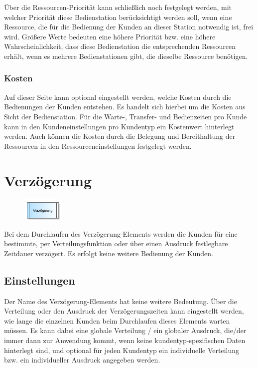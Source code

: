 Über die Ressourcen-Priorität kann schließlich noch festgelegt werden, mit welcher Priorität diese Bedienstation
berücksichtigt werden soll, wenn eine Ressource, die für die Bedienung der Kunden an dieser Station notwendig ist,
frei wird. Größere Werte bedeuten eine höhere Priorität bzw. eine höhere Wahrscheinlichkeit, dass diese Bedienstation
die entsprechenden Ressourcen erhält, wenn es mehrere Bedienstationen gibt, die dieselbe Ressource benötigen.

\subsubsection*{Kosten}

Auf dieser Seite kann optional eingestellt werden, welche Kosten durch die Bedienungen der Kunden entstehen.
Es handelt sich hierbei um die Kosten aus Sicht der Bedienstation. Für die Warte-, Transfer- und Bedienzeiten pro
Kunde kann in den Kundeneinstellungen pro Kundentyp ein Kostenwert hinterlegt werden. Auch können die Kosten durch
die Belegung und Bereithaltung der Ressourcen in den Ressourceneinstellungen festgelegt werden.


\section{Verzögerung}
\label{ref:ModelElementDelay}

\begin{figure}
\vspace{-22pt}
\includegraphics[width=2cm]{imageModelElementDelay.png}
\vspace{-22pt}
\end{figure}

Bei dem Durchlaufen des Verzögerung-Elements werden die Kunden für eine bestimmte, per Verteilungsfunktion oder über
einen Ausdruck festlegbare Zeitdauer verzögert. Es erfolgt keine weitere Bedienung der Kunden.

\subsection*{Einstellungen}

Der Name des Verzögerung-Elements hat keine weitere Bedeutung. Über die Verteilung oder den Ausdruck der Verzögerungszeiten kann
eingestellt werden, wie lange die einzelnen Kunden beim Durchlaufen dieses Elements warten müssen.
Es kann dabei eine globale Verteilung / ein globaler Ausdruck, die/der immer dann zur Anwendung kommt, wenn keine
kundentyp-spezifischen Daten hinterlegt sind, und optional für jeden Kundentyp ein individuelle
Verteilung bzw. ein individueller Ausdruck angegeben werden.





